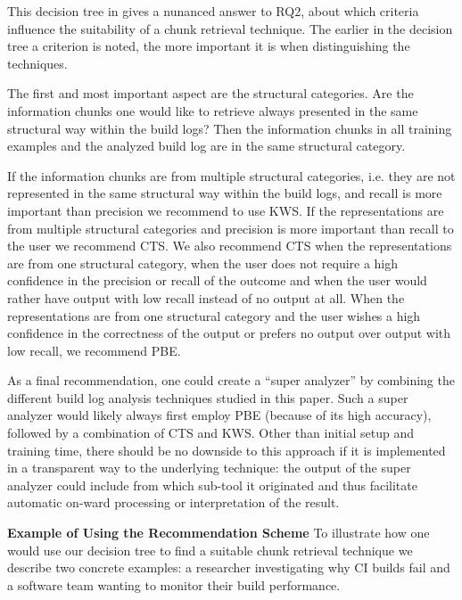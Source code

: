This decision tree in  gives a nunanced
answer to RQ2, about which criteria influence the suitability of a
chunk retrieval technique. The earlier in the decision tree a
criterion is noted, the more important it is when distinguishing the
techniques.

The first and most important aspect are the structural categories. Are
the information chunks one would like to retrieve always presented in
the same structural way within the build logs? Then the information
chunks in all training examples and the analyzed build log are in the
same structural category.

If the information chunks are from multiple structural categories,
i.e. they are not represented in the same structural way within the
build logs, and recall is more important than precision we recommend
to use KWS\@. If the representations are from multiple structural
categories and precision is more important than recall to the user we
recommend CTS\@. We also recommend CTS when the representations are
from one structural category, when the user does not require a high
confidence in the precision or recall of the outcome and when the user
would rather have output with low recall instead of no output at all.
When the representations are from one structural category and the user
wishes a high confidence in the correctness of the output or prefers
no output over output with low recall, we recommend PBE\@.

As a final recommendation, one could create a ``super analyzer'' by
combining the different build log analysis techniques studied in this
paper. Such a super analyzer would likely always first employ PBE
(because of its high accuracy), followed by a combination of CTS and
KWS. Other than initial setup and training time, there should be no
downside to this approach if it is implemented in a transparent way to
the underlying technique: the output of the super analyzer could
include from which sub-tool it originated and thus facilitate
automatic on-ward processing or interpretation of the result.


\noindent
\textbf{Example of Using the Recommendation Scheme}
To illustrate how one would use our decision tree to find a suitable
chunk retrieval technique we describe two concrete examples: a
researcher investigating why CI builds fail and a software team
wanting to monitor their build performance.

